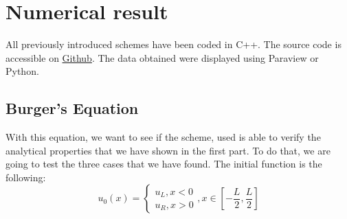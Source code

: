 \clearpage
\newpage

\section{Numerical result}
    All previously introduced schemes have been coded in C++. The source code is accessible on \href{https://github.com/Alexsaphir/TER}{Github}. The data obtained were displayed using Paraview or Python.
    
    \subsection{Burger's Equation}
        With this equation, we want to see if the scheme, used is able to verify the analytical properties that we have shown in the first part. To do that, we are going to test the three cases that we have found.
        The initial function is the following:
        \begin{equation*}
            u_0(x) = \begin{cases} u_L , x<0 \\ u_R, x>0  \end{cases}, x\in [-\frac{L}{2},\frac{L}{2}]
        \end{equation*}
        
